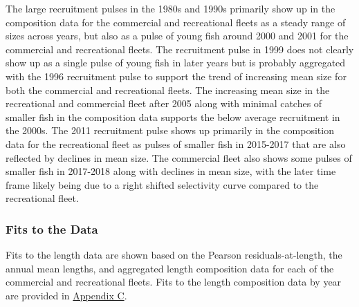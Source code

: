 \documentclass[11pt,
  english,
  a4paper,
]{article}
\begin{document}
The large recruitment pulses in the 1980s and 1990s primarily show up in the composition data for the commercial and recreational fleets as a steady range of sizes across years, but also as a pulse of young fish around 2000 and 2001 for the commercial and recreational fleets. The recruitment pulse in 1999 does not clearly show up as a single pulse of young fish in later years but is probably aggregated with the 1996 recruitment pulse to support the trend of increasing mean size for both the commercial and recreational fleets. The increasing mean size in the recreational and commercial fleet after 2005 along with minimal catches of smaller fish in the composition data supports the below average recruitment in the 2000s. The 2011 recruitment pulse shows up primarily in the composition data for the recreational fleet as pulses of smaller fish in 2015-2017 that are also reflected by declines in mean size. The commercial fleet also shows some pulses of smaller fish in 2017-2018 along with declines in mean size, with the later time frame likely being due to a right shifted selectivity curve compared to the recreational fleet.

\leavevmode\tagmcend\tagstructend\par


\hypertarget{fits-to-the-data}{%
\subsubsection{Fits to the Data}\label{fits-to-the-data}}

\leavevmode\tagmcend\tagstructend


Fits to the length data are shown based on the Pearson residuals-at-length, the annual mean lengths, and aggregated length composition data for each of the commercial and recreational fleets. Fits to the length composition data by year are provided in {\protect\hyperlink{append_c}{Appendix C}\leavevmode\tagmcend\tagstructend}.

\leavevmode\tagmcend\tagstructend\par

\end{document}
